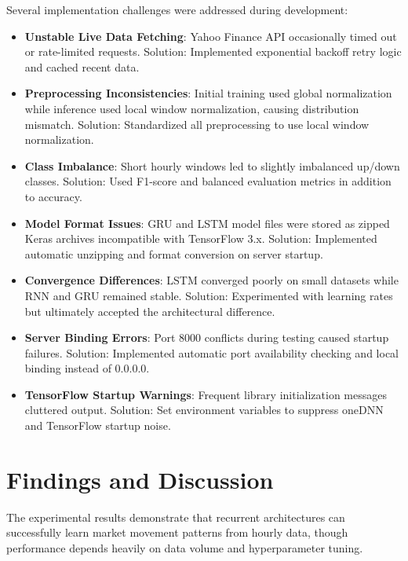 \documentclass[conference]{IEEEtran}
\begin{document}
Several implementation challenges were addressed during development:

\begin{itemize}
    \item \textbf{Unstable Live Data Fetching}: Yahoo Finance API occasionally timed out or rate-limited requests. Solution: Implemented exponential backoff retry logic and cached recent data.
    
    \item \textbf{Preprocessing Inconsistencies}: Initial training used global normalization while inference used local window normalization, causing distribution mismatch. Solution: Standardized all preprocessing to use local window normalization.
    
    \item \textbf{Class Imbalance}: Short hourly windows led to slightly imbalanced up/down classes. Solution: Used F1-score and balanced evaluation metrics in addition to accuracy.
    
    \item \textbf{Model Format Issues}: GRU and LSTM model files were stored as zipped Keras archives incompatible with TensorFlow 3.x. Solution: Implemented automatic unzipping and format conversion on server startup.
    
    \item \textbf{Convergence Differences}: LSTM converged poorly on small datasets while RNN and GRU remained stable. Solution: Experimented with learning rates but ultimately accepted the architectural difference.
    
    \item \textbf{Server Binding Errors}: Port 8000 conflicts during testing caused startup failures. Solution: Implemented automatic port availability checking and local binding instead of 0.0.0.0.
    
    \item \textbf{TensorFlow Startup Warnings}: Frequent library initialization messages cluttered output. Solution: Set environment variables to suppress oneDNN and TensorFlow startup noise.
\end{itemize}

\section{Findings and Discussion}

The experimental results demonstrate that recurrent architectures can successfully learn market movement patterns from hourly data, though performance depends heavily on data volume and hyperparameter tuning.
\end{document}
